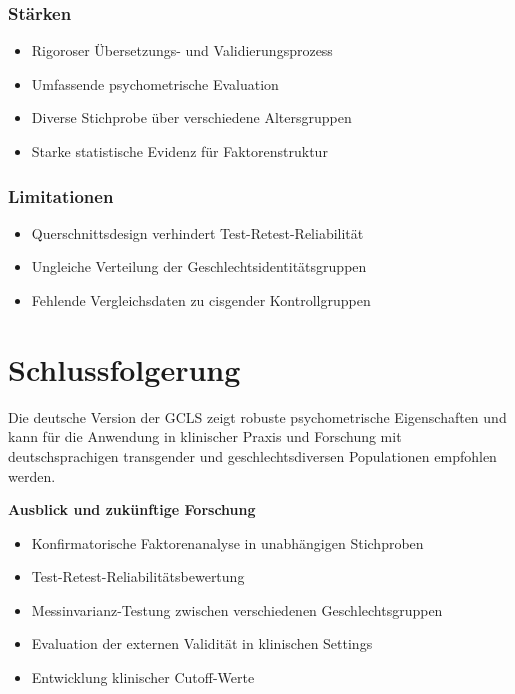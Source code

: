 \documentclass[11pt,a4paper]{article}
\begin{document}
\subsubsection{Stärken}
\begin{itemize}
    \item Rigoroser Übersetzungs- und Validierungsprozess
    \item Umfassende psychometrische Evaluation
    \item Diverse Stichprobe über verschiedene Altersgruppen
    \item Starke statistische Evidenz für Faktorenstruktur
\end{itemize}

\subsubsection{Limitationen}
\begin{itemize}
    \item Querschnittsdesign verhindert Test-Retest-Reliabilität
    \item Ungleiche Verteilung der Geschlechtsidentitätsgruppen
    \item Fehlende Vergleichsdaten zu cisgender Kontrollgruppen
\end{itemize}

\section{Schlussfolgerung}

Die deutsche Version der GCLS zeigt robuste psychometrische Eigenschaften und kann für die Anwendung in klinischer Praxis und Forschung mit deutschsprachigen transgender und geschlechtsdiversen Populationen empfohlen werden.

\begin{center}
\begin{tcolorbox}[colback=darkblue!15,colframe=darkblue,width=0.9\textwidth,arc=3mm]
\centering
\textbf{\large Ausblick und zukünftige Forschung}\\[0.5cm]
\small
\begin{itemize}
    \item Konfirmatorische Faktorenanalyse in unabhängigen Stichproben
    \item Test-Retest-Reliabilitätsbewertung
    \item Messinvarianz-Testung zwischen verschiedenen Geschlechtsgruppen
    \item Evaluation der externen Validität in klinischen Settings
    \item Entwicklung klinischer Cutoff-Werte
\end{itemize}
\end{tcolorbox}
\end{center}
\end{document}
